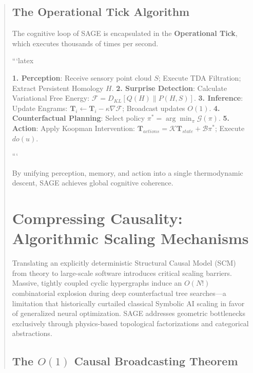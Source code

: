 \documentclass[10pt,twocolumn,letterpaper]{article}
\begin{document}
\begin{abstract}
\subsection{The Operational Tick Algorithm}

The cognitive loop of SAGE is encapsulated in the \textbf{Operational Tick}, which executes thousands of times per second.

```latex
\begin{algorithm}
\caption{The SAGE Operational Tick}
\begin{algorithmic}
\LOOP
    \STATE \textbf{1. Perception}: Receive sensory point cloud $S$; Execute TDA Filtration; Extract Persistent Homology $H$.
    \STATE \textbf{2. Surprise Detection}: Calculate Variational Free Energy: $\mathcal{F} = D_{KL}[Q(H) \| P(H, S)]$.
    \STATE \textbf{3. Inference}: Update Engrams: $\mathbf{T}_i \leftarrow \mathbf{T}_i - \kappa \nabla \mathcal{F}$; Broadcast updates $O(1)$.
    \STATE \textbf{4. Counterfactual Planning}: Select policy $\pi^* = \arg\min_{\pi} \mathcal{G}(\pi)$.
    \STATE \textbf{5. Action}: Apply Koopman Intervention: $\mathbf{T}_{actions} = \mathcal{K} \mathbf{T}_{state} + \mathcal{B} \pi^*$; Execute $do(u)$.
\ENDLOOP
\end{algorithmic}
\end{algorithm}
```

By unifying perception, memory, and action into a single thermodynamic descent, SAGE achieves global cognitive coherence.


\section{Compressing Causality: Algorithmic Scaling Mechanisms}

Translating an explicitly deterministic Structural Causal Model (SCM) from theory to large-scale software introduces critical scaling barriers. Massive, tightly coupled cyclic hypergraphs induce an $O(N!)$ combinatorial explosion during deep counterfactual tree searches—a limitation that historically curtailed classical Symbolic AI scaling in favor of generalized neural optimization. SAGE addresses geometric bottlenecks exclusively through physics-based topological factorizations and categorical abstractions.

\subsection{The $O(1)$ Causal Broadcasting Theorem}


\end{abstract}
\end{document}
